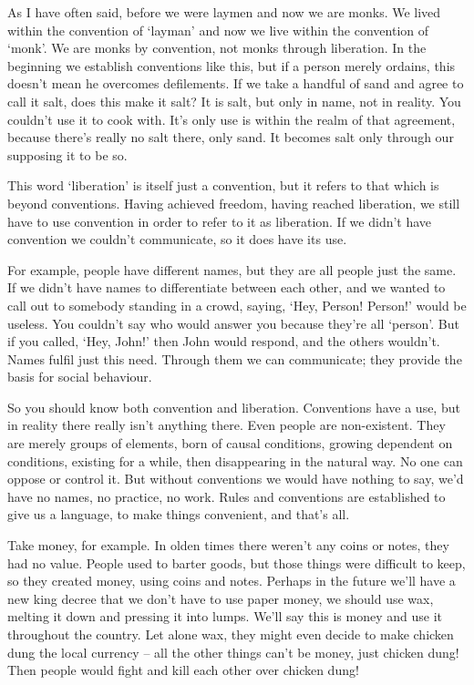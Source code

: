 As I have often said, before we were laymen and now we are monks. We lived within the convention of `layman' and now we live within the convention of `monk'. We are monks by convention, not monks through liberation. In the beginning we establish conventions like this, but if a person merely ordains, this doesn't mean he overcomes defilements. If we take a handful of sand and agree to call it salt, does this make it salt? It is salt, but only in name, not in reality. You couldn't use it to cook with. It's only use is within the realm of that agreement, because there's really no salt there, only sand. It becomes salt only through our supposing it to be so.

This word `liberation' is itself just a convention, but it refers to that which is beyond conventions. Having achieved freedom, having reached liberation, we still have to use convention in order to refer to it as liberation. If we didn't have convention we couldn't communicate, so it does have its use. 

For example, people have different names, but they are all people just the same. If we didn't have names to differentiate between each other, and we wanted to call out to somebody standing in a crowd, saying, `Hey, Person! Person!' would be useless. You couldn't say who would answer you because they're all `person'. But if you called, `Hey, John!' then John would respond, and the others wouldn't. Names fulfil just this need. Through them we can communicate; they provide the basis for social behaviour. 

So you should know both convention and liberation. Conventions have a use, but in reality there really isn't anything there. Even people are non-existent. They are merely groups of elements, born of causal conditions, growing dependent on conditions, existing for a while, then disappearing in the natural way. No one can oppose or control it. But without conventions we would have nothing to say, we'd have no names, no practice, no work. Rules and conventions are established to give us a language, to make things convenient, and that's all. 

Take money, for example. In olden times there weren't any coins or notes, they had no value. People used to barter goods, but those things were difficult to keep, so they created money, using coins and notes. Perhaps in the future we'll have a new king decree that we don't have to use paper money, we should use wax, melting it down and pressing it into lumps. We'll say this is money and use it throughout the country. Let alone wax, they might even decide to make chicken dung the local currency -- all the other things can't be money, just chicken dung! Then people would fight and kill each other over chicken dung! 

